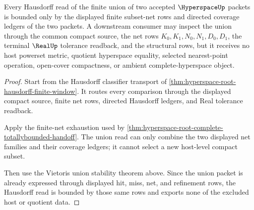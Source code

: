 \begin{theorem}
\label{thm:hyperspace-hausdorff-union-boundary}
Every Hausdorff read of the finite union of two accepted $\HyperspaceUp$ packets is bounded only by the displayed finite subset-net rows and directed coverage ledgers of the two packets. A downstream consumer may inspect the union through the common compact source, the net rows $K_0,K_1,N_0,N_1,D_0,D_1$, the terminal $\RealUp$ tolerance readback, and the structural rows, but it receives no host powerset metric, quotient hyperspace equality, selected nearest-point operation, open-cover compactness, or ambient complete-hyperspace object.
\end{theorem}
\begin{proof}
Start from the Hausdorff classifier transport of \autoref{thm:hyperspace-root-hausdorff-finite-window}. It routes every comparison through the displayed compact source, finite net rows, directed Hausdorff ledgers, and Real tolerance readback.

Apply the finite-net exhaustion used by \autoref{thm:hyperspace-root-complete-totallybounded-handoff}. The union read can only combine the two displayed net families and their coverage ledgers; it cannot select a new host-level compact subset.

Then use the Vietoris union stability theorem above. Since the union packet is already expressed through displayed hit, miss, net, and refinement rows, the Hausdorff read is bounded by those same rows and exports none of the excluded host or quotient data.
\end{proof}
